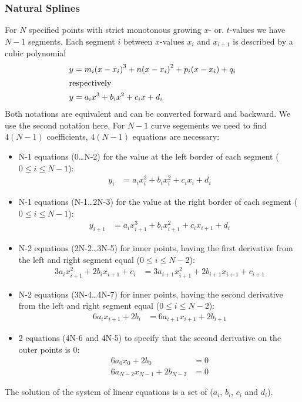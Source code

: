 \documentclass[origlongtable]{scrartcl}
\begin{document}
\subsubsection{Natural Splines}
For \(N\) specified points with strict monotonous growing
\(x\)- or. \(t\)-values
we have \(N-1\) segments. Each segment \(i\) between
\(x\)-values \(x_i\) and \(x_{i+1}\)
is described by a cubic polynomial
\begin{align*}
y&=m_i{(x-x_i)}^3+n{(x-x_i)}^2+p_i(x-x_i)+q_i\\
\intertext{respectively}
y&=a_ix^3+b_ix^2+c_ix+d_i
\end{align*}
Both notations are equivalent and can be converted forward and backward.
We use the second notation here.
\clearpage
For \(N-1\) curve segements we need to find \(4(N-1)\) coefficients,
\(4(N-1)\) equations are necessary:
\begin{itemize}
\item	N-1 equations (0\ldots{}N-2) for the value at the left border
of each segment (\(0\leq i\leq N-1\)):
\begin{align*}y_i&=a_ix_i^3+b_ix_i^2+c_ix_i+d_i\end{align*}
\item	N-1 equations (N-1\ldots{}2N-3) for the value at the right border
of each segment (\(0\leq i\leq N-1\)):
\begin{align*}y_{i+1}&=a_ix_{i+1}^3+b_ix_{i+1}^2+c_ix_{i+1}+d_i\end{align*}
\item	N-2 equations (2N-2\ldots{}3N-5) for inner points, having the
first derivative from the left and right segment equal (\(0\leq i\leq N-2\)):
\begin{align*}3a_ix_{i+1}^2+2b_ix_{i+1}+c_i&=3a_{i+1}x_{i+1}^2+2b_{i+1}x_{i+1}+c_{i+1}\end{align*}
\item	N-2 equations (3N-4\ldots{}4N-7) for inner points, having the
second derivative from the left and right segment equal (\(0\leq i\leq N-2\)):
\begin{align*}6a_ix_{i+1}+2b_i&=6a_{i+1}x_{i+1}+2b_{i+1}\end{align*}
\item	2 equations (4N-6 and 4N-5) to specify that the second derivative
on the outer points is 0:
\begin{align*}
6a_0x_0+2b_0&=0\\[0.2em]
6a_{N-2}x_{N-1}+2b_{N-2}&=0\end{align*}
\end{itemize}
The solution of the system of linear equations is a set of
(\(a_i\), \(b_i\), \(c_i\) and \(d_i\)).
\end{document}
